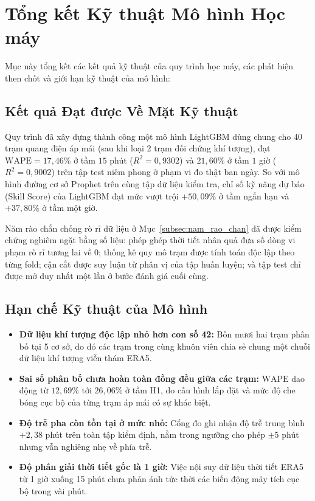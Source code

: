 \documentclass[12pt, a4paper]{report}
\begin{document}
\FloatBarrier
\section{Tổng kết Kỹ thuật Mô hình Học máy}
\label{sec:tong_ket_ky_thuat_ml}

Mục này tổng kết các kết quả kỹ thuật của quy trình học máy, các phát hiện then chốt và giới hạn kỹ thuật của mô hình:

\FloatBarrier
\subsection{Kết quả Đạt được Về Mặt Kỹ thuật}

Quy trình đã xây dựng thành công một mô hình LightGBM dùng chung cho $40$ trạm quang điện áp mái (sau khi loại 2 trạm đối chứng khí tượng), đạt $\text{WAPE} = 17{,}46\%$ ở tầm $15$ phút ($R^2 = 0{,}9302$) và $21{,}60\%$ ở tầm $1$ giờ ($R^2 = 0{,}9002$) trên tập test niêm phong ở phạm vi đo thật ban ngày. So với mô hình đường cơ sở Prophet trên cùng tập dữ liệu kiểm tra, chỉ số kỹ năng dự báo (Skill Score) của LightGBM đạt mức vượt trội $+50{,}09\%$ ở tầm ngắn hạn và $+37{,}80\%$ ở tầm một giờ.

Năm rào chắn chống rò rỉ dữ liệu ở Mục~\ref{subsec:nam_rao_chan} đã được kiểm chứng nghiêm ngặt bằng số liệu: phép ghép thời tiết nhân quả đưa số dòng vi phạm rò rỉ tương lai về $0$; thống kê quy mô trạm được tính toán độc lập theo từng fold; cận cắt được suy luận từ phân vị của tập huấn luyện; và tập test chỉ được mở duy nhất một lần ở bước đánh giá cuối cùng.

\FloatBarrier
\subsection{Hạn chế Kỹ thuật của Mô hình}

\begin{itemize}[noitemsep]
    \item \textbf{Dữ liệu khí tượng độc lập nhỏ hơn con số 42:} Bốn mươi hai trạm phân bố tại 5 cơ sở, do đó các trạm trong cùng khuôn viên chia sẻ chung một chuỗi dữ liệu khí tượng viễn thám ERA5.
    \item \textbf{Sai số phân bố chưa hoàn toàn đồng đều giữa các trạm:} $\text{WAPE}$ dao động từ $12{,}69\%$ tới $26{,}06\%$ ở tầm H1, do cấu hình lắp đặt và mức độ che bóng cục bộ của từng trạm áp mái có sự khác biệt.
    \item \textbf{Độ trễ pha còn tồn tại ở mức nhỏ:} Cổng đo ghi nhận độ trễ trung bình $+2{,}38$ phút trên toàn tập kiểm định, nằm trong ngưỡng cho phép $\pm 5$ phút nhưng vẫn nghiêng nhẹ về phía trễ.
    \item \textbf{Độ phân giải thời tiết gốc là 1 giờ:} Việc nội suy dữ liệu thời tiết ERA5 từ 1 giờ xuống 15 phút chưa phản ánh tức thời các biến động mây tích cục bộ trong vài phút.
\end{itemize}
\end{document}
